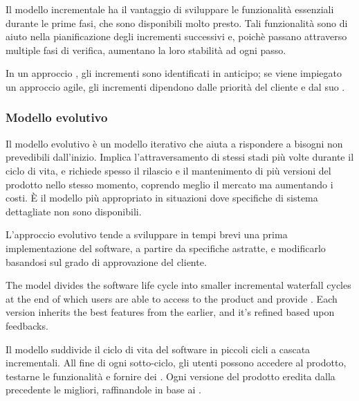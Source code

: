 
Il modello incrementale ha il vantaggio di sviluppare le funzionalità essenziali
durante le prime fasi, che sono disponibili molto presto. Tali funzionalità sono
di aiuto nella pianificazione degli incrementi successivi e, poichè passano
attraverso multiple fasi di verifica, aumentano la loro stabilità ad ogni passo.

In un approccio , gli incrementi sono identificati in
anticipo; se viene impiegato un approccio agile, gli incrementi dipendono dalle
priorità del cliente e dal suo .


\subsubsection{Modello evolutivo}

Il modello evolutivo è un modello iterativo che aiuta a rispondere a bisogni non
prevedibili dall'inizio. Implica l'attraversamento di stessi stadi più volte
durante il ciclo di vita, e richiede spesso il rilascio e il mantenimento di più
versioni del prodotto nello stesso momento, coprendo meglio il mercato ma
aumentando i costi. È il modello più appropriato in situazioni dove specifiche
di sistema dettagliate non sono disponibili.

L'approccio evolutivo tende a sviluppare in tempi brevi una prima
implementazione del software, a partire da specifiche astratte, e modificarlo
basandosi sul grado di approvazione del cliente.

The model divides the software life cycle into smaller incremental waterfall
cycles at the end of which users are able to access to the product and provide
. Each version inherits the best features from the earlier, and
it's refined based upon feedbacks.

Il modello suddivide il ciclo di vita del software in piccoli cicli a cascata
incrementali. All fine di ogni sotto-ciclo, gli utenti possono accedere al
prodotto, testarne le funzionalità e fornire dei . Ogni
versione del prodotto eredita dalla precedente le  migliori,
raffinandole in base ai . 

